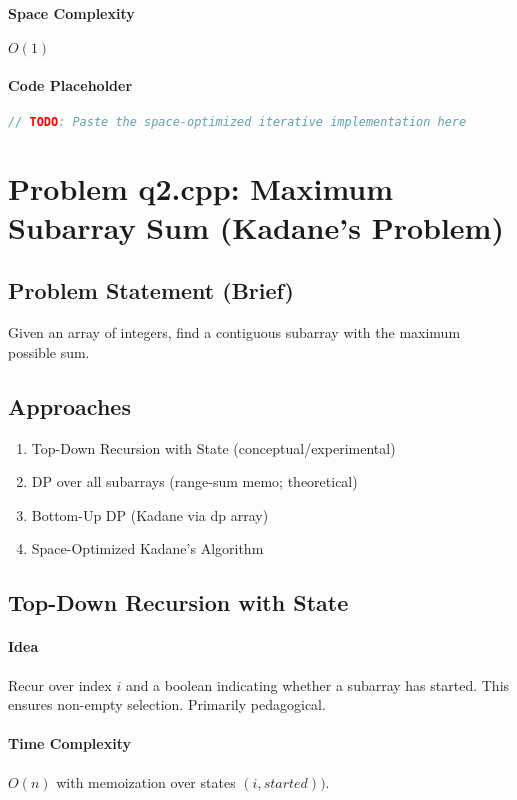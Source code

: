 \documentclass[11pt,a4paper]{article}
\begin{document}
\paragraph{Space Complexity} \(O(1)\)

\paragraph{Code Placeholder}
\begin{lstlisting}[language=C++, caption={q1: Space-Optimized Iterative}, label={lst:q1-iter}]
// TODO: Paste the space-optimized iterative implementation here
\end{lstlisting}

\section{Problem q2.cpp: Maximum Subarray Sum (Kadane's Problem)}
\subsection{Problem Statement (Brief)}
Given an array of integers, find a contiguous subarray with the maximum possible sum.

\subsection{Approaches}
\begin{enumerate}[leftmargin=*]
  \item Top-Down Recursion with State (conceptual/experimental)
  \item DP over all subarrays (range-sum memo; theoretical) 
  \item Bottom-Up DP (Kadane via dp array)
  \item Space-Optimized Kadane's Algorithm
\end{enumerate}

\subsection{Top-Down Recursion with State}
\paragraph{Idea} Recur over index \(i\) and a boolean indicating whether a subarray has started. This ensures non-empty selection. Primarily pedagogical.

\paragraph{Time Complexity} \(O(n)\) with memoization over states \((i, started))\).
\end{document}
